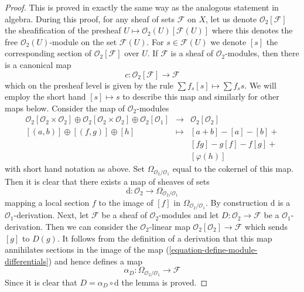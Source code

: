 \begin{proof}
This is proved in exactly the same way as the analogous statement in algebra.
During this proof, for any sheaf of sets $\mathcal{F}$ on $X$,
let us denote $\mathcal{O}_2[\mathcal{F}]$ the sheafification of the
presheaf $U \mapsto \mathcal{O}_2(U)[\mathcal{F}(U)]$ where this denotes
the free $\mathcal{O}_2(U)$-module on the set $\mathcal{F}(U)$.
For $s \in \mathcal{F}(U)$ we denote $[s]$ the corresponding section
of $\mathcal{O}_2[\mathcal{F}]$ over $U$. If $\mathcal{F}$ is a sheaf of
$\mathcal{O}_2$-modules, then there is a canonical map
$$
c : \mathcal{O}_2[\mathcal{F}] \longrightarrow \mathcal{F}
$$
which on the presheaf level is given by the rule
$\sum f_s[s] \mapsto \sum f_s s$. We will employ the short hand
$[s] \mapsto s$ to
describe this map and similarly for other maps below. Consider
the map of $\mathcal{O}_2$-modules
\begin{equation}
\label{equation-define-module-differentials}
\begin{matrix}
\mathcal{O}_2[\mathcal{O}_2 \times \mathcal{O}_2] \oplus
\mathcal{O}_2[\mathcal{O}_2 \times \mathcal{O}_2] \oplus
\mathcal{O}_2[\mathcal{O}_1] &
\longrightarrow &
\mathcal{O}_2[\mathcal{O}_2] \\
[(a, b)] \oplus [(f, g)] \oplus [h] & \longmapsto & [a + b] - [a] - [b] + \\
& & [fg] - g[f] - f[g] + \\
& & [\varphi(h)]
\end{matrix}
\end{equation}
with short hand notation as above. Set $\Omega_{\mathcal{O}_2/\mathcal{O}_1}$
equal to the cokernel of this map. Then it is clear that there exists
a map of sheaves of sets
$$
\text{d} : \mathcal{O}_2 \longrightarrow \Omega_{\mathcal{O}_2/\mathcal{O}_1}
$$
mapping a local section $f$ to the image of $[f]$ in
$\Omega_{\mathcal{O}_2/\mathcal{O}_1}$. By construction $\text{d}$
is a $\mathcal{O}_1$-derivation. Next, let $\mathcal{F}$
be a sheaf of $\mathcal{O}_2$-modules and let
$D : \mathcal{O}_2 \to \mathcal{F}$ be a $\mathcal{O}_1$-derivation.
Then we can consider the $\mathcal{O}_2$-linear map
$\mathcal{O}_2[\mathcal{O}_2] \to \mathcal{F}$ which sends $[g]$ to $D(g)$.
It follows from the definition of a derivation that this map annihilates
sections in the image of the map (\ref{equation-define-module-differentials})
and hence defines a map
$$
\alpha_D : \Omega_{\mathcal{O}_2/\mathcal{O}_1} \longrightarrow \mathcal{F}
$$
Since it is clear that $D = \alpha_D \circ \text{d}$ the lemma is proved.
\end{proof}

